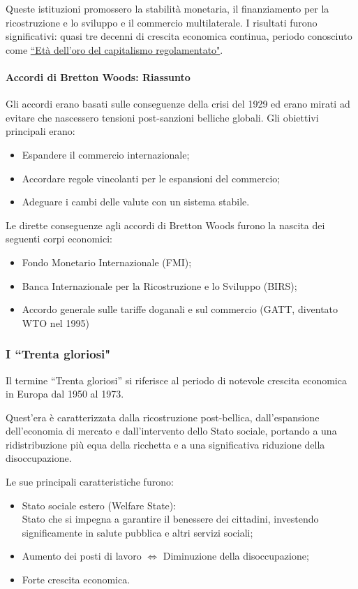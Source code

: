 \documentclass{article}
\begin{document}
Queste istituzioni promossero la stabilità monetaria, il finanziamento per la ricostruzione e
lo sviluppo e il commercio multilaterale. I risultati furono significativi:
quasi tre decenni di crescita economica continua, periodo conosciuto come 
\underline{``Età dell'oro del capitalismo regolamentato"}.

\paragraph{Accordi di Bretton Woods: Riassunto} \phantom{}

Gli accordi erano basati sulle conseguenze della crisi del 1929 ed erano mirati ad evitare che
nascessero tensioni post-sanzioni belliche globali. Gli obiettivi principali erano:
\begin{itemize}
    \item Espandere il commercio internazionale;
    \item Accordare regole vincolanti per le espansioni del commercio;
    \item Adeguare i cambi delle valute con un sistema stabile.
\end{itemize}

Le dirette conseguenze agli accordi di Bretton Woods furono la nascita dei seguenti corpi economici:
\begin{itemize}
    \item Fondo Monetario Internazionale (FMI);
    \item Banca Internazionale per la Ricostruzione e lo Sviluppo (BIRS);
    \item Accordo generale sulle tariffe doganali e sul commercio (GATT, diventato WTO nel 1995)
\end{itemize}

\subsubsection{I ``Trenta gloriosi"}
Il termine ``Trenta gloriosi'' si riferisce al periodo di notevole crescita economica in Europa
dal 1950 al 1973.

Quest'era è caratterizzata dalla ricostruzione post-bellica, dall'espansione dell'economia di
mercato e dall'intervento dello Stato sociale, portando a una ridistribuzione più equa della
ricchetta e a una significativa riduzione della disoccupazione. 

Le sue principali caratteristiche furono:
\begin{itemize}
    \item Stato sociale estero (Welfare State):\\ Stato che si impegna a garantire il benessere dei cittadini,
    investendo significamente in salute pubblica e altri servizi sociali;
    \item Aumento dei posti di lavoro $\Longleftrightarrow$ Diminuzione della disoccupazione;

    \item Forte crescita economica.
\end{itemize}
\end{document}
